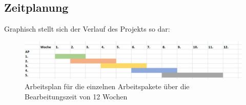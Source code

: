 \subsection{Zeitplanung}

Graphisch stellt sich der Verlauf des Projekts so dar:

\begin{figure}[h]
	\begin{center}
		\includegraphics[scale=0.5]{Zeitplan_graphisch.jpg}
		\caption[Arbeitsplan]{Arbeitsplan für die einzelnen Arbeitspakete über die Bearbeitungszeit von 12 Wochen}
	\end{center}
\end{figure}


















